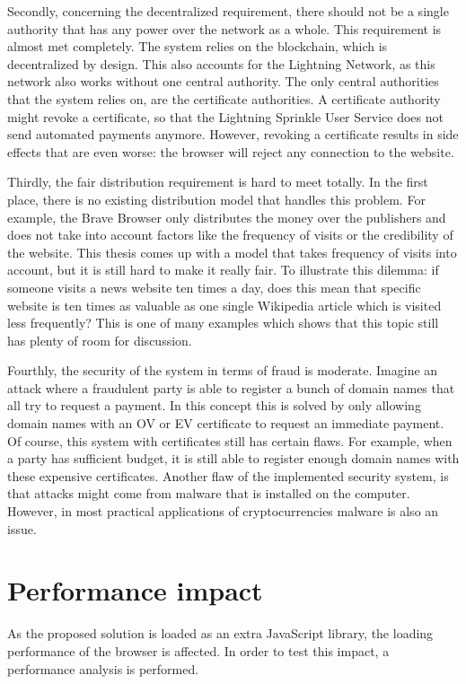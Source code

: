 Secondly, concerning the decentralized requirement, there should not be a single authority that has any power over the network as a whole. This requirement is almost met completely. The system relies on the blockchain, which is decentralized by design. This also accounts for the Lightning Network, as this network also works without one central authority. The only central authorities that the system relies on, are the certificate authorities. A certificate authority might revoke a certificate, so that the Lightning Sprinkle User Service does not send automated payments anymore. However, revoking a certificate results in side effects that are even worse: the browser will reject any connection to the website.

Thirdly, the fair distribution requirement is hard to meet totally. In the first place, there is no existing distribution model that handles this problem. For example, the Brave Browser only distributes the money over the publishers and does not take into account factors like the frequency of visits or the credibility of the website. This thesis comes up with a model that takes frequency of visits into account, but it is still hard to make it really fair. To illustrate this dilemma: if someone visits a news website ten times a day, does this mean that specific website is ten times as valuable as one single Wikipedia article which is visited less frequently? This is one of many examples which shows that this topic still has plenty of room for discussion. 


Fourthly, the security of the system in terms of fraud is moderate. Imagine an attack where a fraudulent party is able to register a bunch of domain names that all try to request a payment. In this concept this is solved by only allowing domain names with an OV or EV certificate to request an immediate payment. Of course, this system with certificates still has certain flaws. For example, when a party has sufficient budget, it is still able to register enough domain names with these expensive certificates. Another flaw of the implemented security system, is that attacks might come from malware that is installed on the computer. However, in most practical applications of cryptocurrencies malware is also an issue.


\section{Performance impact}
As the proposed solution is loaded as an extra JavaScript library, the loading performance of the browser is affected. In order to test this impact, a performance analysis is performed.

